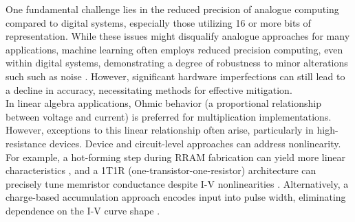 \noindent One fundamental challenge lies in the reduced precision of analogue computing compared to digital systems, especially those utilizing 16 or more bits of representation. While these issues might disqualify analogue approaches for many applications, machine learning often employs reduced precision computing, even within digital systems, demonstrating a degree of robustness to minor alterations such such as noise \cite{cheney2017robustness}. However, significant hardware imperfections can still lead to a decline in accuracy, necessitating methods for effective mitigation.\\




\noindent In linear algebra applications, Ohmic behavior (a proportional relationship between voltage and current) is preferred for multiplication implementations. However, exceptions to this linear relationship often arise, particularly in high-resistance devices. Device and circuit-level approaches can address nonlinearity. For example, a hot-forming step during RRAM fabrication can yield more linear characteristics \cite{sung2018effect}, and a 1T1R (one-transistor-one-resistor) architecture can precisely tune memristor conductance despite I-V nonlinearities \cite{li2018analogue}. Alternatively, a charge-based accumulation approach encodes input into pulse width, eliminating dependence on the I-V curve shape \cite{amirsoleimani2020memory}.\\

